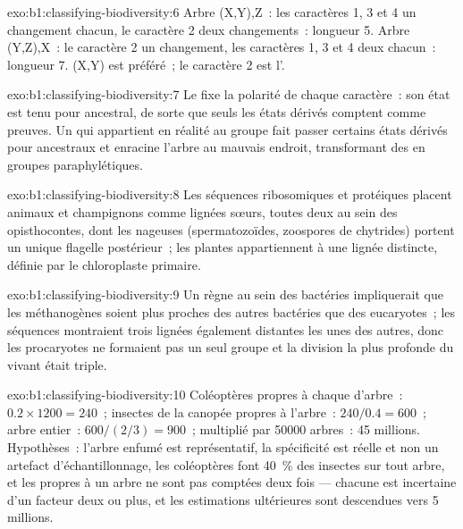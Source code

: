 \begin{solution}{exo:b1:classifying-biodiversity:6}
Arbre (X,Y),Z~: les caractères 1, 3 et 4 un changement chacun, le
caractère 2 deux changements~: longueur 5. Arbre (Y,Z),X~: le caractère
2 un changement, les caractères 1, 3 et 4 deux chacun~: longueur 7.
(X,Y) est préféré~; le caractère 2 est l'.
\end{solution}

\begin{solution}{exo:b1:classifying-biodiversity:7}
Le  fixe la polarité de chaque caractère~: son état est
tenu pour ancestral, de sorte que seuls les états dérivés comptent
comme preuves. Un  qui appartient en réalité au groupe
fait passer certains états dérivés pour ancestraux et enracine l'arbre
au mauvais endroit, transformant des  en groupes paraphylétiques.
\end{solution}

\begin{solution}{exo:b1:classifying-biodiversity:8}
Les séquences ribosomiques et protéiques placent animaux et champignons
comme lignées sœurs, toutes deux au sein des opisthocontes, dont les
 nageuses (spermatozoïdes, zoospores de chytrides) portent un
unique flagelle postérieur~; les plantes appartiennent à une lignée
distincte, définie par le chloroplaste primaire.
\end{solution}

\begin{solution}{exo:b1:classifying-biodiversity:9}
Un règne au sein des bactéries impliquerait que les méthanogènes soient
plus proches des autres bactéries que des eucaryotes~; les séquences
montraient trois lignées également distantes les unes des autres, donc
les procaryotes ne formaient pas un seul groupe et la division la plus
profonde du vivant était triple.
\end{solution}

\begin{solution}{exo:b1:classifying-biodiversity:10}
Coléoptères propres à chaque  d'arbre~: $0.2\times 1200 = 240$~;
insectes de la canopée propres à l'arbre~: $240/0.4 = 600$~; arbre
entier~: $600/(2/3) = 900$~; multiplié par \num{50000} arbres~: \num{45}
millions. Hypothèses~: l'arbre enfumé est représentatif, la spécificité
est réelle et non un artefact d'échantillonnage, les coléoptères font
\qty{40}{\%} des insectes sur tout arbre, et les  propres à un
arbre ne sont pas comptées deux fois --- chacune est incertaine d'un
facteur deux ou plus, et les estimations ultérieures sont descendues
vers \num{5} millions.
\end{solution}

